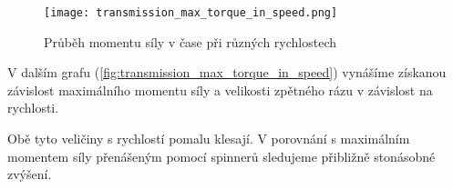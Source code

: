 \raggedright{
}
\begin{wrapfigure}{r}{0.55\textwidth}
    \texttt{[image: transmission\_max\_torque\_in\_speed.png]}
    \caption{Průběh momentu síly v čase při různých rychlostech}
    \label{fig:transmission_max_torque_in_speed}
\end{wrapfigure}

V dalším grafu (\autoref{fig:transmission_max_torque_in_speed}) vynášíme získanou závislost maximálního momentu síly a velikosti zpětného rázu v závislost na rychlosti. 

Obě tyto veličiny s rychlostí pomalu klesají. V porovnání s maximálním momentem síly přenášeným pomocí spinnerů sledujeme přibližně stonásobné zvýšení.

